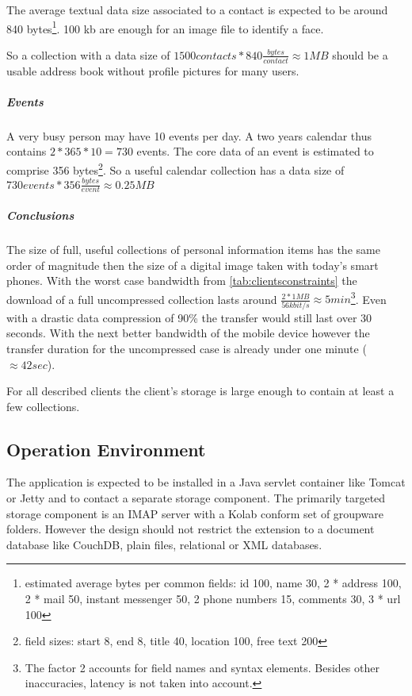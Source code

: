 \documentclass[12pt,a4paper]{scrartcl}		%
\begin{document}
The average textual data size associated to a contact is expected to be around
840 bytes\footnote{estimated average bytes per common fields: id 100, name 30, 2 *
  address 100, 2 * mail 50, instant messenger 50, 2 phone numbers 15, comments
  30, 3 * url 100}. 100 kb are enough for an image file to identify a face.

So a collection with a data size of $1500 contacts * 840 \frac{bytes}{contact}
\approx 1MB$ should be a usable address book without profile pictures for many
users.

\subparagraph{Events}

A very busy person may have 10 events per day. A two years calendar thus
contains $2*365*10=730$ events. The core data of an event is estimated to
comprise 356 bytes\footnote{field sizes: start 8, end 8, title 40, location 100,
  free text 200}. So a useful calendar collection has a data size of $730 events
* 356 \frac{bytes}{event} \approx 0.25 MB$

\subparagraph{Conclusions} The size of full, useful collections of personal
information items has the same order of magnitude then the size of a digital
image taken with today's smart phones. With the worst case bandwidth from
\autoref{tab:clientsconstraints} the download of a full uncompressed collection
lasts around $\frac{2 * 1MB}{56kbit/s} \approx 5min$\footnote{The factor 2
  accounts for field names and syntax elements. Besides other inaccuracies,
  latency is not taken into account.}. Even with a drastic data compression of
90\% the transfer would still last over 30 seconds. With the next better
bandwidth of the mobile device however the transfer duration for the
uncompressed case is already under one minute ($\approx 42 sec$).

For all described clients the client's storage is large enough to contain at
least a few collections.

\subsection{Operation Environment}

The application is expected to be installed in a Java servlet container like
Tomcat or Jetty and to contact a separate storage component. The primarily
targeted storage component is an IMAP server with a Kolab conform set of
groupware folders. However the design should not restrict the extension to a
document database like CouchDB, plain files, relational or XML databases.
\end{document}
